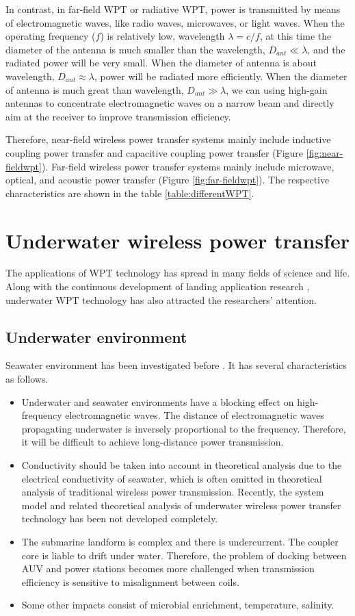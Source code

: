 In contrast, in far-field WPT or radiative WPT, power is transmitted by means of electromagnetic waves, like radio waves, microwaves, or light waves. 
When the operating frequency ($f$) is relatively low, wavelength $\lambda = c/f$, at this time the diameter of the antenna is much smaller than the wavelength, $D_{ant} \ll \lambda$, and the radiated power will be very small. 
When the diameter of antenna is about wavelength, $D_{ant} \approx \lambda$, power will be radiated more efficiently. 
When the diameter of antenna is much great than wavelength, $D_{ant} \gg \lambda$, we can using high-gain antennas to concentrate electromagnetic waves on a narrow beam and directly aim at the receiver to improve transmission efficiency.


Therefore, near-field wireless power transfer systems mainly include inductive coupling power transfer and capacitive coupling power transfer (Figure \ref{fig:near-fieldwpt}). Far-field wireless power transfer systems mainly include microwave, optical, and acoustic power transfer (Figure \ref{fig:far-fieldwpt}).  The respective characteristics are shown in the table \ref{table:differentWPT}.


\section{Underwater wireless power transfer}
The applications of WPT technology has spread in many fields of science and life.
Along with the continuous development of landing application research \cite{Zhang2019}, underwater WPT technology has also attracted the researchers' attention. 
\subsection{Underwater environment}
Seawater environment has been investigated before \cite{}. It has several characteristics as follows.

\begin{itemize}
    \item Underwater and seawater environments have a blocking effect on high-frequency electromagnetic waves. 
    The distance of electromagnetic waves propagating underwater is inversely proportional to the frequency.
    Therefore, it will be difficult to achieve long-distance power transmission.
    \item Conductivity should be taken into account in theoretical analysis due to the electrical conductivity of seawater, which is often omitted in theoretical analysis of traditional wireless power transmission. 
    Recently, the system model and related theoretical analysis of underwater wireless power transfer technology has been not developed completely.
    \item The submarine landform is complex and there is undercurrent. 
    The coupler core is liable to drift under water.
    Therefore, the problem of docking between AUV and power stations becomes more challenged when transmission efficiency is sensitive to misalignment between coils.
    \item Some other impacts consist of microbial enrichment, temperature, salinity.
    
\end{itemize}

